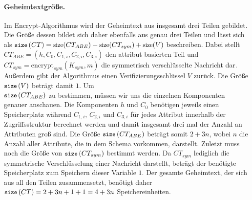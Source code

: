 \paragraph{Geheimtextgröße.}
Im Encrypt-Algorithmus wird der Geheimtext aus insgesamt drei Teilen gebildet.
Die Größe dessen bildet sich daher ebenfalls aus genau drei Teilen und lässt
sich als $\small\texttt{size}\left( CT \right) = \text{size} (CT_{ABE}) + \text{size} (CT_{sym}) + \text{size}
(V)$ beschreiben. Dabei stellt $CT_{ABE} = \left( h, C_0, C_{1,i}, C_{2,i},
C_{3,i} \right)$ den at\-tri\-but-basierten Teil und $CT_{sym} =
\text{encrypt}_{sym}\left(K_{sym}, m\right)$ die symmetrisch ver\-schlüs\-selte
Nachricht dar. Außerdem gibt der Algorithmus einen Verifizierungsschlüssel $V$
zurück. Die Größe $\small\texttt{size}\left( V \right)$ beträgt damit $1$. Um \\ $\small\texttt{size}\left( CT_{ABE} \right)$ zu
bestimmen, müssen wir uns die einzelnen Komponenten genauer anschauen. Die
Komponenten $h$ und $C_0$ benötigen jeweils einen Speicherplatz während
$C_{1,i}$, $C_{2,i}$ und $C_{3,i}$ für jedes Attribut innerhalb der
Zugriffsstruktur berechnet werden und damit insgesamt drei mal der Anzahl an
Attributen groß sind. Die Größe $\small\texttt{size}\left( CT_{ABE} \right)$ beträgt somit $2 + 3n$,
wobei $n$ die Anzahl aller Attribute, die in dem Schema vorkommen, darstellt.
Zuletzt muss noch die Größe von $\small\texttt{size}\left( CT_{sym} \right)$ bestimmt werden. Da
$CT_{sym}$ lediglich die symmetrische Verschlüsselung einer Nachricht darstellt,
beträgt der benötigte Speicherplatz zum Speichern dieser Variable $1$. Der
gesamte Geheimtext, der sich aus all den Teilen zusammensetzt, benötigt daher
$\small\texttt{size}\left( CT \right) = 2 + 3n + 1 + 1 = 4 + 3n$ Speichereinheiten.

